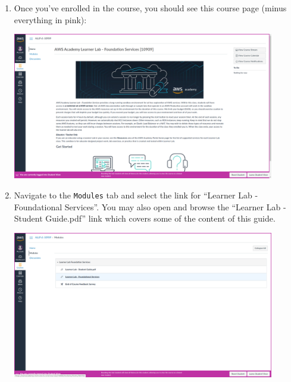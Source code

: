 \documentclass{csse4400}
\begin{document}
\begin{enumerate}

\item Once you've enrolled in the course, you should see this course page (minus everything in pink):

\includegraphics[width=0.9\textwidth]{images/academy-homepage}

\item Navigate to the \texttt{Modules} tab and select the link for ``Learner Lab - Foundational Services''.
      You may also open and browse the ``Learner Lab - Student Guide.pdf'' link which covers some of the content of this guide.

\includegraphics[width=0.9\textwidth]{images/modules-page}


\end{enumerate}
\end{document}
